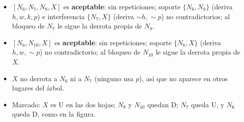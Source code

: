 \documentclass[11pt,a4paper]{article}
\begin{document}
\begin{itemize}
  \item $[N_6, N_7, N_8, X]$ es \textbf{aceptable}: sin repeticiones; soporte $\{N_6, N_8\}$ (deriva $h, w, k, p$) e interferencia $\{N_7, X\}$ (deriva ${\sim}h, {\sim}p$) no contradictorios; al bloqueo de $N_7$ le sigue la derrota propia de $N_8$.
  \item $[N_6, N_{10}, X]$ es \textbf{aceptable}: sin repeticiones; soporte $\{N_6, X\}$ (deriva $h, w, {\sim}p$) no contradictorio; al bloqueo de $N_{10}$ le sigue la derrota propia de $X$.
  \item $X$ no derrota a $N_6$ ni a $N_7$ (ninguno usa $p$), así que no aparece en otros lugares del árbol.
  \item Marcado: $X$ es U en las dos hojas; $N_8$ y $N_{10}$ quedan D; $N_7$ queda U, y $N_6$ queda D, como en la figura.
\end{itemize}

\begin{center}
\begin{minipage}{\linewidth}
\centering
{}
\end{minipage}
\end{center}
\end{document}
